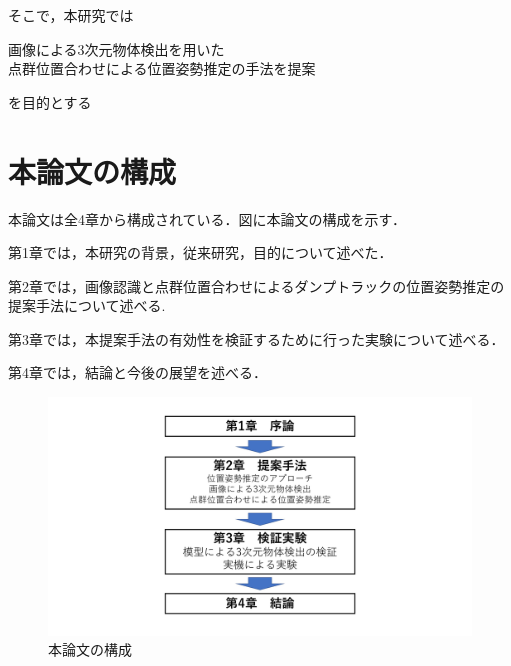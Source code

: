 \par
そこで，本研究では
    \begin{screen}
        \begin{center}
            画像による3次元物体検出を用いた\\点群位置合わせによる位置姿勢推定の手法を提案
        \end{center}
    \end{screen}
を目的とする
\newpage
\section{本論文の構成}
本論文は全4章から構成されている．図に本論文の構成を示す．\par
第1章では，本研究の背景，従来研究，目的について述べた．\par
第2章では，画像認識と点群位置合わせによるダンプトラックの位置姿勢推定の提案手法について述べる.\par
第3章では，本提案手法の有効性を検証するために行った実験について述べる．\par
第4章では，結論と今後の展望を述べる．
\begin{figure}[b]
    \begin{center}
    \includegraphics[width=0.3 \columnwidth]{./chap1/fig/struct.jpg}
    \caption{本論文の構成}
    \label{fig:flow}
    \end{center}
\end{figure}

